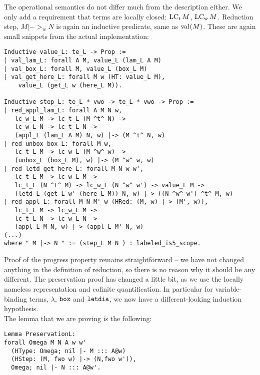 The operational semantics do not differ much from the description either. We only add a requirement that terms are locally closed: $\mbox{${\operatorname{LC_t} {M}}$}$, $\mbox{${\operatorname{LC_w} {M}}$}$. Reduction step, $M |->_w N$ is again an inductive predicate, same as $\mbox{$\mathrm{val}_{}{(M)}$}$. These are again small snippets from the actual implementation:
\begin{verbatim}
Inductive value_L: te_L -> Prop :=
| val_lam_L: forall A M, value_L (lam_L A M)
| val_box_L: forall M, value_L (box_L M)
| val_get_here_L: forall M w (HT: value_L M), 
    value_L (get_L w (here_L M)).

Inductive step_L: te_L * vwo -> te_L * vwo -> Prop :=
| red_appl_lam_L: forall A M N w,
   lc_w_L M -> lc_t_L (M ^t^ N) ->
   lc_w_L N -> lc_t_L N ->
   (appl_L (lam_L A M) N, w) |-> (M ^t^ N, w)
| red_unbox_box_L: forall M w,
   lc_t_L M -> lc_w_L (M ^w^ w) ->
   (unbox_L (box_L M), w) |-> (M ^w^ w, w)
| red_letd_get_here_L: forall M N w w',
   lc_t_L M -> lc_w_L M ->
   lc_t_L (N ^t^ M) -> lc_w_L (N ^w^ w') -> value_L M ->
   (letd_L (get_L w' (here_L M)) N, w) |-> ((N ^w^ w') ^t^ M, w)
| red_appl_L: forall M N M' w (HRed: (M, w) |-> (M', w)),
   lc_t_L M -> lc_w_L M ->
   lc_t_L N -> lc_w_L N ->
   (appl_L M N, w) |-> (appl_L M' N, w)
(...)
where " M |-> N " := (step_L M N ) : labeled_is5_scope.
\end{verbatim}

Proof of the progress property remains straightforward -- we have not changed anything in the definition of reduction, so there is no reason why it should be any different. The preservation proof has changed a little bit, as we use the locally nameless representation and cofinite quantification. In particular for variable-binding terms, $\lambda$, $\texttt{box}{}$ and $\texttt{letdia}{}$, we now have a different-looking induction hypothesis.\\
The lemma that we are proving is the following:
\begin{verbatim}
Lemma PreservationL:
forall Omega M N A w w'
  (HType: Omega; nil |- M ::: A@w)
  (HStep: (M, fwo w) |-> (N,fwo w')),
  Omega; nil |- N ::: A@w'.
\end{verbatim}

